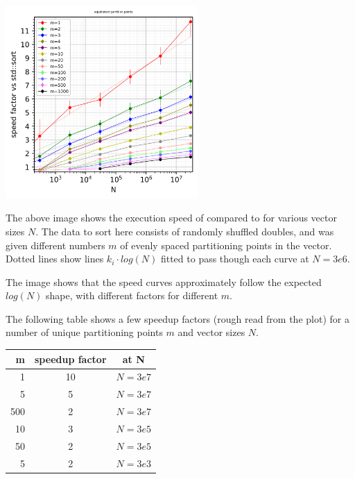 \begin{center}
\includegraphics[width=0.55\textwidth]{plotting/images/partition_points_equidistant_speed_for_n_vs_sort.png}
\end{center}

The above image shows the execution speed of  compared to  for various vector sizes $N$.
The data to sort here consists of randomly shuffled doubles, and  was given different numbers $m$ of evenly spaced partitioning points in the vector. Dotted lines show lines $k_i \cdot log(N)$ fitted to pass though each curve at $N=3e6$.

The image shows that the speed curves approximately follow the expected $log(N)$ shape, with different factors for different $m$.

The following table shows a few speedup factors (rough read from the plot) for a number of unique partitioning points $m$ and vector sizes $N$.

\begin{center}
\begin{tabular}{|r|c|c|} %
  \hline 
  \textbf{m} & \textbf{speedup factor} & \textbf{at N}\\
  \hline 
1 & 10 & $N=3e7$\\
5 & 5 & $N=3e7$\\
500 & 2 & $N=3e7$\\
\hline
10 & 3 & $N=3e5$\\
50 & 2 & $N=3e5$\\
\hline
5 & 2 & $N=3e3$\\
  \hline 
\end{tabular}
\end{center}

